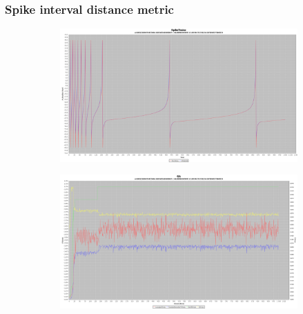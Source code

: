 \documentclass[10pt]{article}
\begin{document}
		\subsubsection{Spike interval distance metric}
			\begin{figure}[H]
				\centering
					\begin{subfigure}{.5\textwidth}
						\centering
						\includegraphics[width=\linewidth]{./../images/izzy4/interval/plot.png}
						
						\label{fig:sub11a}
					\end{subfigure}%
					\begin{subfigure}{.5\textwidth}
						\centering
						\includegraphics[width=\linewidth]{./../images/izzy4/interval/prog.png}
						
						\label{fig:sub11b}
					\end{subfigure}
					
					\label{fig:plot11}
			\end{figure}
\end{document}
